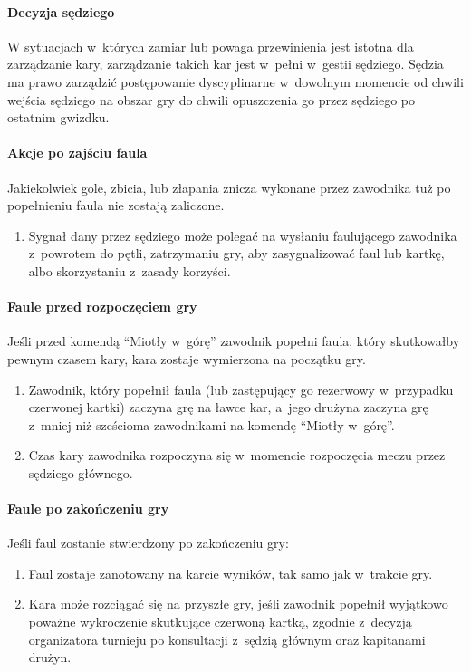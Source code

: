 \documentclass[12pt]{article}
\begin{document}
\paragraph{Decyzja sędziego}
W sytuacjach w~których zamiar lub
powaga przewinienia jest istotna dla zarządzanie kary, zarządzanie
takich kar jest w~pełni w~gestii sędziego. Sędzia ma prawo zarządzić
postępowanie dyscyplinarne w~dowolnym momencie od chwili wejścia
sędziego na obszar gry do chwili opuszczenia go przez sędziego po
ostatnim gwizdku.

\paragraph{Akcje po zajściu faula}
Jakiekolwiek gole, zbicia,
lub złapania znicza wykonane przez zawodnika tuż po popełnieniu faula
nie zostają zaliczone.

\begin{enumerate}
	\item
	      Sygnał dany przez sędziego może polegać na wysłaniu faulującego
	      zawodnika z~powrotem do pętli, zatrzymaniu gry, aby zasygnalizować
	      faul lub kartkę, albo skorzystaniu z~zasady korzyści.
\end{enumerate}

\paragraph{Faule przed rozpoczęciem gry}
Jeśli przed komendą
``Miotły w~górę'' zawodnik popełni faula, który skutkowałby pewnym
czasem kary, kara zostaje wymierzona na początku gry.

\begin{enumerate}
	\item Zawodnik, który popełnił faula (lub zastępujący go rezerwowy w~przypadku czerwonej kartki) zaczyna grę na ławce kar, a~jego drużyna
	      zaczyna grę z~mniej niż sześcioma zawodnikami na komendę ``Miotły w~górę''.

	\item Czas kary zawodnika rozpoczyna się w~momencie rozpoczęcia meczu przez
	      sędziego głównego.
\end{enumerate}

\paragraph{Faule po zakończeniu gry}
Jeśli faul zostanie
stwierdzony po zakończeniu gry:

\begin{enumerate}
	\item Faul zostaje zanotowany na karcie wyników, tak samo jak w~trakcie
	      gry.

	\item Kara może rozciągać się na przyszłe gry, jeśli zawodnik popełnił
	      wyjątkowo poważne wykroczenie skutkujące czerwoną kartką, zgodnie z~decyzją organizatora turnieju po konsultacji z~sędzią głównym oraz
	      kapitanami drużyn.
\end{enumerate}
\end{document}
